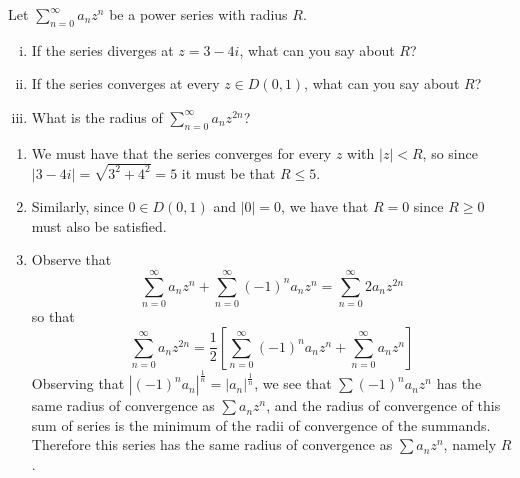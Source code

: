 \documentclass{article}
\newcounter{Problem}
\newenvironment{Problem}{\begin{Exercise}[name={Problem},
                                          counter={Problem}]}
                        {\end{Exercise}}
\begin{document}
\begin{Problem}
  Let $\sum_{n=0}^\infty a_n z^n$ be a power series with radius $R$.
  \begin{enumerate}[(i)]
    \item{
      If the series diverges at $z = 3 - 4i$, what can you say about $R$?
    }
    \item{
      If the series converges at every $z \in D(0, 1)$, what can you say about
      $R$?
    }
    \item{
      What is the radius of $\sum_{n=0}^\infty a_n z^{2n}$?
    }
  \end{enumerate}
\end{Problem}

\begin{Answer}
  \begin{enumerate}
    \item{
      We must have that the series converges for every $z$ with $|z| <
      R$, so since $|3 - 4i| = \sqrt{3^2 + 4^2} = 5$ it must be that
      $R \leq 5$.
    }
    \item{
      Similarly, since $0 \in D(0,1)$ and $|0| = 0$, we have that
      $R = 0$ since $R \geq 0$ must also be satisfied.
    }
    \item{
      Observe that
      $$
      \sum_{n=0}^\infty a_n z^n + \sum_{n=0}^\infty (-1)^n a_n z^n
      = \sum_{n=0}^\infty 2 a_n z^{2n}
      $$
      so that
      $$
        \sum_{n=0}^\infty a_n z^{2n}
      = \frac{1}{2}\left[
          \sum_{n=0}^\infty (-1)^n a_n z^n
        + \sum_{n=0}^\infty a_n z^n
        \right]
      $$
      Observing that $|(-1)^n a_n|^{\frac{1}{n}} =
      |a_n|^{\frac{1}{n}}$, we see that $\sum (-1)^n a_n z^n$ has the
      same radius of convergence as $\sum a_n z^n$, and the radius of
      convergence of this sum of series is the minimum of the radii of
      convergence of the summands. Therefore this series has the same
      radius of convergence as $\sum a_n z^n$, namely $R$.
    }
  \end{enumerate}
\end{Answer}
\end{document}

